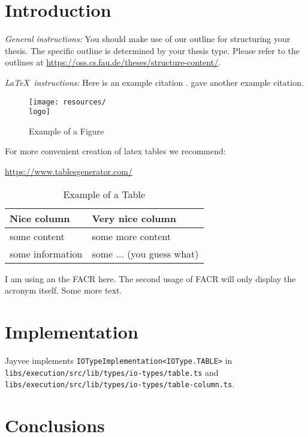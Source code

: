 \chapter{Introduction}
\label{chapter:Introduction}

{\textsl{General instructions:}}
You should make use of our outline for structuring your
thesis. The specific outline is determined by your thesis type.
Please refer to the outlines at
\url{https://oss.cs.fau.de/theses/structure-content/}.

{\textsl{\LaTeX\ instructions:}} Here is an example citation
\autocite{riehle:2011:controlling}.
\textcite{riehle:2007:economic} gave another example citation.

\begin{figure}[ht]
	\texttt{[image: resources/\\logo]}
	\caption{Example of a Figure}
	\label{fig:example}
\end{figure}

For more convenient creation of latex tables we recommend:

\url{https://www.tablesgenerator.com/}

\begin{table}[ht]
	\caption{Example of a Table}
	\label{tab:example}
	\begin{tabular}{|l|l|}
		\hline
		Nice column      & Very nice column          \\
		\hline
		some content     & some more content         \\
		some information & some ... (you guess what) \\
		\hline
	\end{tabular}
\end{table}

I am using an the \ac{FACR} here. The second usage of \ac{FACR} will only display the acronym itself.
\newpage
Some more text.







\chapter{Implementation}
\label{chapter:Implementation}

Jayvee implements \texttt{IOTypeImplementation<IOType.TABLE>} in \texttt{libs/execution/src/lib/types/io-types/table.ts} and \texttt{libs/execution/src/lib/types/io-types/table-column.ts}.



\chapter{Conclusions}
\label{chapter:Conclusions}

